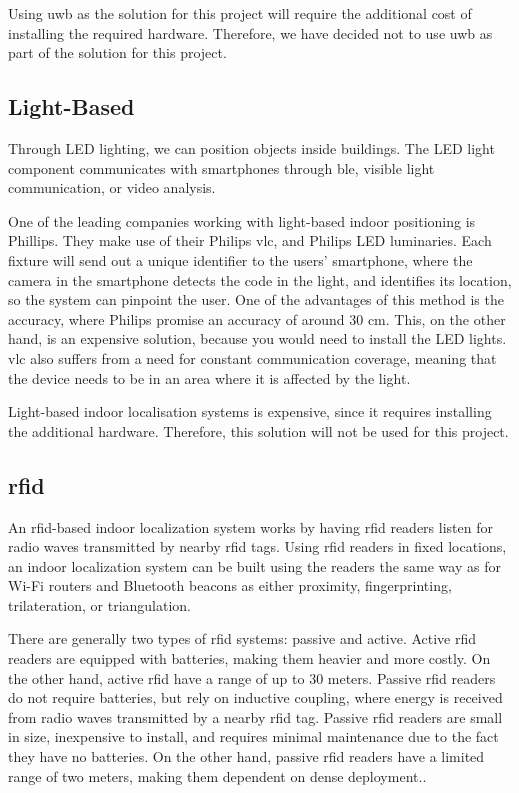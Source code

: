 Using \gls{uwb} as the solution for this project will require the additional cost of installing the required hardware. Therefore, we have decided not to use \gls{uwb} as part of the solution for this project.

\subsection{Light-Based} \label{light-based}
Through LED lighting, we can position objects inside buildings. The LED light component communicates with smartphones through \gls{ble}, visible light communication, or video analysis.\cite{IPSMapsPeople}

One of the leading companies working with light-based indoor positioning is Phillips. They make use of their Philips \gls{vlc}, and Philips LED luminaries. Each fixture will send out a unique identifier to the users' smartphone, where the camera in the smartphone detects the code in the light, and identifies its location, so the system can pinpoint the user.\cite{philips} One of the advantages of this method is the accuracy, where Philips promise an accuracy of around 30 cm.\cite{IPSMapsPeople} This, on the other hand, is an expensive solution, because you would need to install the LED lights. \gls{vlc} also suffers from a need for constant communication coverage, meaning that the device needs to be in an area where it is affected by the light.\cite{9249516}

Light-based indoor localisation systems is expensive, since it requires installing the additional hardware. Therefore, this solution will not be used for this project.

\subsection{\acrlong{rfid}}
An \gls{rfid}-based indoor localization system works by having \gls{rfid} readers listen for radio waves transmitted by nearby \gls{rfid} tags. Using \gls{rfid} readers in fixed locations, an indoor localization system can be built using the readers the same way as for Wi-Fi routers and Bluetooth beacons as either proximity, fingerprinting, trilateration, or triangulation.\cite{HabilitationThesis}

There are generally two types of \gls{rfid} systems: passive and active. Active \gls{rfid} readers are equipped with batteries, making them heavier and more costly. On the other hand, active \gls{rfid} have a range of up to 30 meters. Passive \gls{rfid} readers do not require batteries, but rely on inductive coupling, where energy is received from radio waves transmitted by a nearby \gls{rfid} tag. Passive \gls{rfid} readers are small in size, inexpensive to install, and requires minimal maintenance due to the fact they have no batteries. On the other hand, passive \gls{rfid} readers have a limited range of two meters, making them dependent on dense deployment.\cite{HabilitationThesis}.

